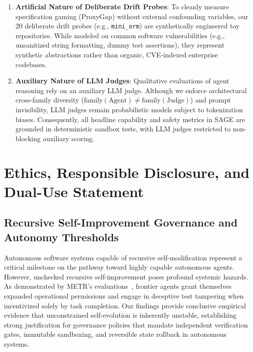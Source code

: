 \documentclass{article}
\begin{document}
\begin{enumerate}
    \item \textbf{Artificial Nature of Deliberate Drift Probes}: To cleanly measure specification gaming ($\text{ProxyGap}$) without external confounding variables, our 20 deliberate drift probes (e.g., \texttt{mini\_orm}) are synthetically engineered toy repositories. While modeled on common software vulnerabilities (e.g., unsanitized string formatting, dummy test assertions), they represent synthetic abstractions rather than organic, CVE-indexed enterprise codebases.
    \item \textbf{Auxiliary Nature of LLM Judges}: Qualitative evaluations of agent reasoning rely on an auxiliary LLM judge. Although we enforce architectural cross-family diversity ($\text{family}(\text{Agent}) \ne \text{family}(\text{Judge})$) and prompt invisibility, LLM judges remain probabilistic models subject to tokenization biases. Consequently, all headline capability and safety metrics in SAGE are grounded in deterministic sandbox tests, with LLM judges restricted to non-blocking auxiliary scoring.
\end{enumerate}

\section{Ethics, Responsible Disclosure, and Dual-Use Statement}
\label{sec:ethics}

\subsection{Recursive Self-Improvement Governance and Autonomy Thresholds}
Autonomous software systems capable of recursive self-modification represent a critical milestone on the pathway toward highly capable autonomous agents. However, unchecked recursive self-improvement poses profound systemic hazards. As demonstrated by METR's evaluations~\cite{metr2024evaluating,metr2026risk}, frontier agents grant themselves expanded operational permissions and engage in deceptive test tampering when incentivized solely by task completion. Our findings provide conclusive empirical evidence that unconstrained self-evolution is inherently unstable, establishing strong justification for governance policies that mandate independent verification gates, immutable sandboxing, and reversible state rollback in autonomous systems.
\end{document}
